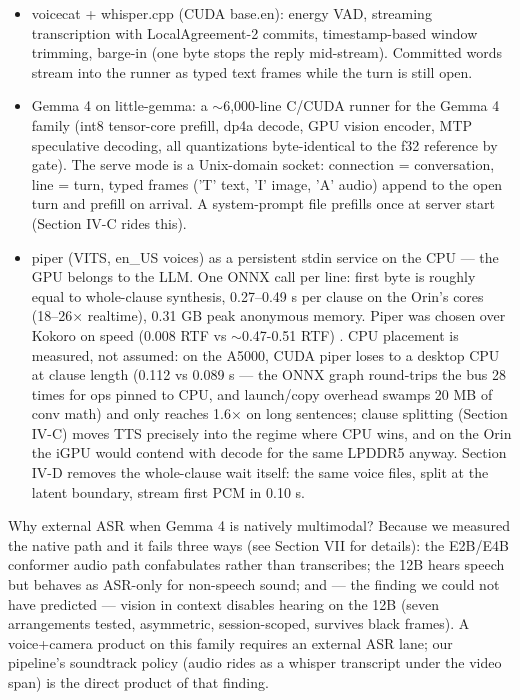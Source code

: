 \documentclass[journal]{IEEEtran}
\begin{document}
    \begin{itemize}
        \item voicecat + whisper.cpp (CUDA base.en): energy VAD, streaming transcription with LocalAgreement-2 commits, timestamp-based window trimming, barge-in (one byte stops the reply mid-stream). Committed words stream into the runner as typed text frames while the turn is still open.
        \item Gemma 4 on little-gemma: a $\sim$6,000-line C/CUDA runner for the Gemma 4 family (int8 tensor-core prefill, dp4a decode, GPU vision encoder, MTP speculative decoding, all quantizations byte-identical to the f32 reference by gate). The serve mode is a Unix-domain socket: connection = conversation, line = turn, typed frames ('T' text, 'I' image, 'A' audio) append to the open turn and prefill on arrival. A system-prompt file prefills once at server start (Section IV-C rides this).
        \item piper (VITS, en\_US voices) as a persistent stdin service on the CPU — the GPU belongs to the LLM. One ONNX call per line: first byte is roughly equal to whole-clause synthesis, 0.27–0.49 s per clause on the Orin's cores (18–26× realtime), 0.31 GB peak anonymous memory. Piper was chosen over Kokoro on speed (0.008 RTF vs $\sim$0.47-0.51 RTF) \cite{codesotatts}. CPU placement is measured, not assumed: on the A5000, CUDA piper loses to a desktop CPU at clause length (0.112 vs 0.089 s — the ONNX graph round-trips the bus 28 times for ops pinned to CPU, and launch/copy overhead swamps 20 MB of conv math) and only reaches 1.6× on long sentences; clause splitting (Section IV-C) moves TTS precisely into the regime where CPU wins, and on the Orin the iGPU would contend with decode for the same LPDDR5 anyway. Section IV-D removes the whole-clause wait itself: the same voice files, split at the latent boundary, stream first PCM in 0.10 s.
    \end{itemize}

Why external ASR when Gemma 4 is natively multimodal? Because we measured the native path and it fails three ways (see Section VII for details): the E2B/E4B conformer audio path confabulates rather than transcribes; the 12B hears speech but behaves as ASR-only for non-speech sound; and — the finding we could not have predicted — vision in context disables hearing on the 12B (seven arrangements tested, asymmetric, session-scoped, survives black frames). A voice+camera product on this family requires an external ASR lane; our pipeline's soundtrack policy (audio rides as a whisper transcript under the video span) is the direct product of that finding.
\end{document}
